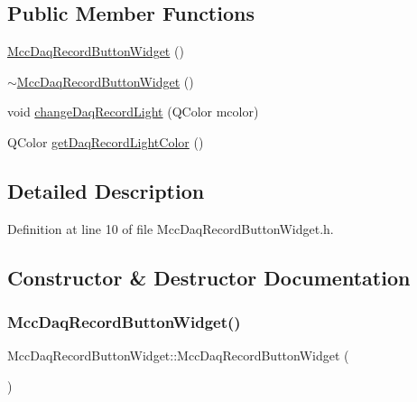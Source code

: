 \subsection*{Public Member Functions}
\begin{DoxyCompactItemize}
\item 
\hyperlink{class_mcc_daq_record_button_widget_a22460e7232297141d2f0a9026e499a18}{Mcc\+Daq\+Record\+Button\+Widget} ()
\item 
\hyperlink{class_mcc_daq_record_button_widget_a34199ccdab0d187434826a9291fbf4ba}{$\sim$\+Mcc\+Daq\+Record\+Button\+Widget} ()
\item 
void \hyperlink{class_mcc_daq_record_button_widget_af756c9d1918c871e907a032f3059e65d}{change\+Daq\+Record\+Light} (Q\+Color mcolor)
\item 
Q\+Color \hyperlink{class_mcc_daq_record_button_widget_a9d3a8523e25ad34223a0ba94adbf61fb}{get\+Daq\+Record\+Light\+Color} ()
\end{DoxyCompactItemize}


\subsection{Detailed Description}


Definition at line 10 of file Mcc\+Daq\+Record\+Button\+Widget.\+h.



\subsection{Constructor \& Destructor Documentation}
\mbox{\label{class_mcc_daq_record_button_widget_a22460e7232297141d2f0a9026e499a18}} 
\subsubsection{\texorpdfstring{Mcc\+Daq\+Record\+Button\+Widget()}{MccDaqRecordButtonWidget()}}
{\footnotesize\ttfamily Mcc\+Daq\+Record\+Button\+Widget\+::\+Mcc\+Daq\+Record\+Button\+Widget (\begin{DoxyParamCaption}{ }\end{DoxyParamCaption})}



